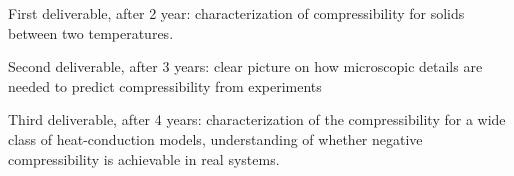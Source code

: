 \begin{workpackage}
\begin{wpdelivs}
  \begin{wpdeliv}[due=24,id=mydeliv1,dissem=PU,nature=DEM,lead=UNIPD]
      {First deliverable, after 2 year: characterization of compressibility for solids between two temperatures.}
  \end{wpdeliv}
  \begin{wpdeliv}[due=36,id=mydeliv2,dissem=PU,nature=DEM,lead=UNIPD]
      {Second deliverable, after 3 years: clear picture on how microscopic details are needed to predict compressibility from experiments}
  \end{wpdeliv}
  \begin{wpdeliv}[due=48,id=mydeliv3,dissem=PU,nature=DEM,lead=UNIPD]
      {Third deliverable, after 4 years: characterization of the compressibility for a wide class of heat-conduction models, understanding of whether negative compressibility is achievable in real systems.}
\end{wpdeliv}
\end{wpdelivs}




\end{workpackage}
